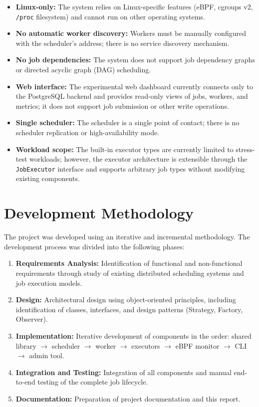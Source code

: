 \begin{itemize}
    \item \textbf{Linux-only:} The system relies on Linux-specific features (eBPF, cgroups v2, \texttt{/proc} filesystem) and cannot run on other operating systems.
    \item \textbf{No automatic worker discovery:} Workers must be manually configured with the scheduler's address; there is no service discovery mechanism.
    \item \textbf{No job dependencies:} The system does not support job dependency graphs or directed acyclic graph (DAG) scheduling.
    \item \textbf{Web interface:} The experimental web dashboard currently connects only to the PostgreSQL backend and provides read-only views of jobs, workers, and metrics; it does not support job submission or other write operations.
    \item \textbf{Single scheduler:} The scheduler is a single point of contact; there is no scheduler replication or high-availability mode.
    \item \textbf{Workload scope:} The built-in executor types are currently limited to stress-test workloads; however, the executor architecture is extensible through the \texttt{JobExecutor} interface and supports arbitrary job types without modifying existing components.
\end{itemize}

\section{Development Methodology}

The project was developed using an iterative and incremental methodology. The development process was divided into the following phases:

\begin{enumerate}
    \item \textbf{Requirements Analysis:} Identification of functional and non-functional requirements through study of existing distributed scheduling systems and job execution models.
    \item \textbf{Design:} Architectural design using object-oriented principles, including identification of classes, interfaces, and design patterns (Strategy, Factory, Observer).
    \item \textbf{Implementation:} Iterative development of components in the order: shared library $\rightarrow$ scheduler $\rightarrow$ worker $\rightarrow$ executors $\rightarrow$ eBPF monitor $\rightarrow$ CLI $\rightarrow$ admin tool.
    \item \textbf{Integration and Testing:} Integration of all components and manual end-to-end testing of the complete job lifecycle.
    \item \textbf{Documentation:} Preparation of project documentation and this report.
\end{enumerate}

